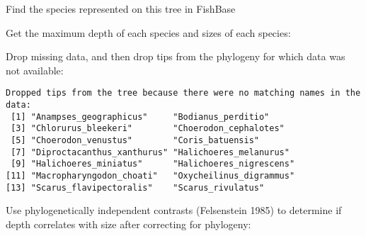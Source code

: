 \begin{Shaded}
\begin{Highlighting}[]
\end{Highlighting}
\end{Shaded}
Find the species represented on this tree in FishBase

\begin{Shaded}
\begin{Highlighting}[]
\end{Highlighting}
\end{Shaded}
Get the maximum depth of each species and sizes of each species:

\begin{Shaded}
\begin{Highlighting}[]
\NormalTok{(fish.data[myfish])[,}\NormalTok{]}
\NormalTok{)}
\end{Highlighting}
\end{Shaded}
Drop missing data, and then drop tips from the phylogeny for which data
was not available:

\begin{Shaded}
\begin{Highlighting}[]
\NormalTok{(}
\end{Highlighting}
\end{Shaded}
\begin{verbatim}
Dropped tips from the tree because there were no matching names in the data:
 [1] "Anampses_geographicus"     "Bodianus_perditio"        
 [3] "Chlorurus_bleekeri"        "Choerodon_cephalotes"     
 [5] "Choerodon_venustus"        "Coris_batuensis"          
 [7] "Diproctacanthus_xanthurus" "Halichoeres_melanurus"    
 [9] "Halichoeres_miniatus"      "Halichoeres_nigrescens"   
[11] "Macropharyngodon_choati"   "Oxycheilinus_digrammus"   
[13] "Scarus_flavipectoralis"    "Scarus_rivulatus"         
\end{verbatim}
Use phylogenetically independent contrasts (Felsenstein 1985) to
determine if depth correlates with size after correcting for phylogeny:

